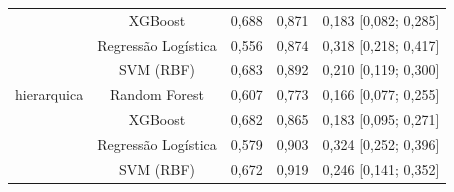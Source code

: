 \begin{table}[htbp]
\begin{tabular}{lcccc}
     & XGBoost & 0,688 & 0,871 & 0,183 [0,082; 0,285] \\
     & Regressão Logística & 0,556 & 0,874 & 0,318 [0,218; 0,417] \\
     & SVM (RBF) & 0,683 & 0,892 & 0,210 [0,119; 0,300] \\
    hierarquica & Random Forest & 0,607 & 0,773 & 0,166 [0,077; 0,255] \\
     & XGBoost & 0,682 & 0,865 & 0,183 [0,095; 0,271] \\
     & Regressão Logística & 0,579 & 0,903 & 0,324 [0,252; 0,396] \\
     & SVM (RBF) & 0,672 & 0,919 & 0,246 [0,141; 0,352] \\
    \bottomrule
  \end{tabular}
\end{table}
